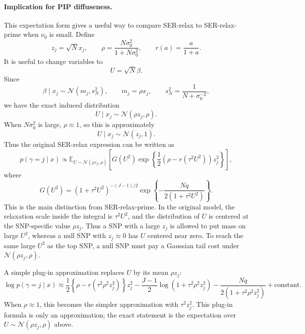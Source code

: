 \documentclass[11pt]{article}
\newcommand{\E}{\mathbb E}
\newcommand{\Normal}{\mathcal N}
\begin{document}
\paragraph{Implication for PIP diffuseness.}
This expectation form gives a useful way to compare SER-relax to
SER-relax-prime when $\nu_0$ is small. Define
\[
z_j = \sqrt{N}x_j,\qquad
\rho = \frac{N\sigma_0^2}{1+N\sigma_0^2},
\qquad
r(a) = \frac{a}{1+a}.
\]
It is useful to change variables to
\[
U=\sqrt{N}\beta.
\]
Since
\[
\beta \mid x_j \sim \Normal(m_j,s_N^2),
\qquad
m_j = \rho x_j,\qquad s_N^2=\frac{1}{N+\sigma_0^{-2}},
\]
we have the exact induced distribution
\[
U \mid x_j \sim \Normal(\rho z_j,\rho).
\]
When $N\sigma_0^2$ is large, $\rho\approx 1$, so this is approximately
\[
U \mid x_j \sim \Normal(z_j,1).
\]
Thus the original SER-relax expression can be written as
\[
p(\gamma=j \mid x)
\propto
\E_{U \sim \Normal(\rho z_j,\rho)}
\left[
G(U^2)
\exp\left\{
\frac{1}{2}\left(\rho-r(\tau^2U^2)\right)z_j^2
\right\}
\right],
\]
where
\[
G(U^2)
=
(1+\tau^2U^2)^{-(J-1)/2}
\exp\left\{
-\frac{Nq}{2(1+\tau^2U^2)}
\right\}.
\]
This is the main distinction from SER-relax-prime. In the original model, the
relaxation scale inside the integral is $\tau^2U^2$, and the distribution of
$U$ is centered at the SNP-specific value $\rho z_j$. Thus a SNP with a large
$z_j$ is allowed to put mass on large $U^2$, whereas a null SNP with
$z_j\approx 0$ has $U$ centered near zero. To reach the same large $U^2$ as
the top SNP, a null SNP must pay a Gaussian tail cost under
$\Normal(\rho z_j,\rho)$.

A simple plug-in approximation replaces $U$ by its mean $\rho z_j$:
\[
\log p(\gamma=j\mid x)
\approx
\frac{1}{2}\left\{\rho-r(\tau^2\rho^2 z_j^2)\right\}z_j^2
-\frac{J-1}{2}\log(1+\tau^2\rho^2 z_j^2)
-\frac{Nq}{2(1+\tau^2\rho^2 z_j^2)}
+ \text{constant}.
\]
When $\rho\approx 1$, this becomes the simpler approximation with
$\tau^2z_j^2$. This plug-in formula is only an approximation; the exact
statement is the expectation over $U \sim \Normal(\rho z_j,\rho)$ above.
\end{document}
